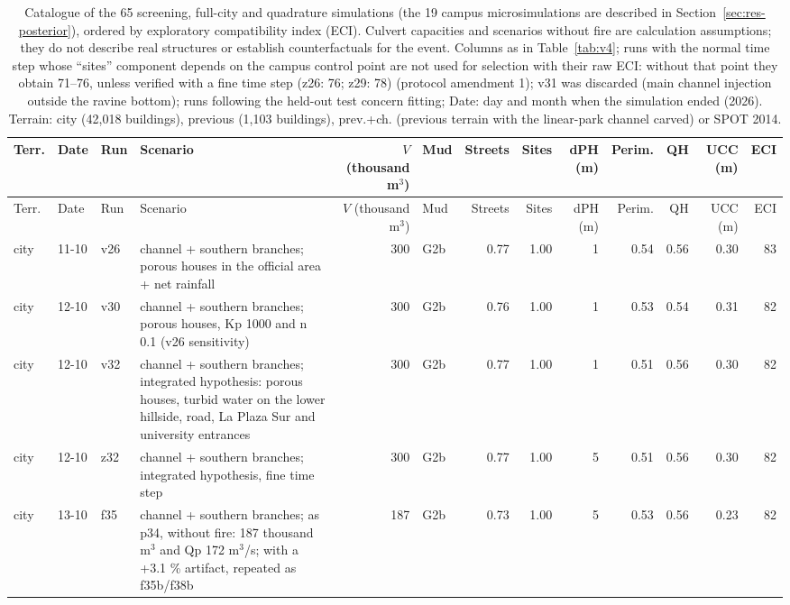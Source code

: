{\scriptsize\setlength{\tabcolsep}{2.5pt}
\begin{longtable}{lll>{\raggedright\arraybackslash}p{3.3cm}rlrrrrrrr}
\caption{Catalogue of the 65 screening, full-city and quadrature simulations (the 19 campus microsimulations are described in Section~\ref{sec:res-posterior}), ordered by exploratory compatibility index (ECI). Culvert capacities and scenarios without fire are calculation assumptions; they do not describe real structures or establish counterfactuals for the event. Columns as in Table~\ref{tab:v4}; runs with the normal time step whose ``sites'' component depends on the campus control point are not used for selection with their raw ECI: without that point they obtain 71--76, unless verified with a fine time step (z26: 76; z29: 78) (protocol amendment 1); v31 was discarded (main channel injection outside the ravine bottom); runs following the held-out test concern fitting; Date: day and month when the simulation ended (2026). Terrain: city (42,018 buildings), previous (1,103 buildings), prev.+ch. (previous terrain with the linear-park channel carved) or SPOT 2014.}\label{tab:catalogo}\\\toprule
Terr. & Date & Run & Scenario & $V$ (thousand m$^3$) & Mud & Streets & Sites & dPH (m) & Perim. & QH & UCC (m) & ECI\\\midrule\endfirsthead
\toprule Terr. & Date & Run & Scenario & $V$ (thousand m$^3$) & Mud & Streets & Sites & dPH (m) & Perim. & QH & UCC (m) & ECI\\\midrule\endhead
city & 11-10 & v26 & channel + southern branches; porous houses in the official area + net rainfall & 300 & G2b & 0.77 & 1.00 & 1 & 0.54 & 0.56 & 0.30 & 83\\
city & 12-10 & v30 & channel + southern branches; porous houses, Kp 1000 and n 0.1 (v26 sensitivity) & 300 & G2b & 0.76 & 1.00 & 1 & 0.53 & 0.54 & 0.31 & 82\\
city & 12-10 & v32 & channel + southern branches; integrated hypothesis: porous houses, turbid water on the lower hillside, road, La Plaza Sur and university entrances & 300 & G2b & 0.77 & 1.00 & 1 & 0.51 & 0.56 & 0.30 & 82\\
city & 12-10 & z32 & channel + southern branches; integrated hypothesis, fine time step & 300 & G2b & 0.77 & 1.00 & 5 & 0.51 & 0.56 & 0.30 & 82\\
city & 13-10 & f35 & channel + southern branches; as p34, without fire: 187 thousand m$^3$ and Qp 172 m$^3$/s; with a +3.1 \% artifact, repeated as f35b/f38b & 187 & G2b & 0.73 & 1.00 & 5 & 0.53 & 0.56 & 0.23 & 82\\

\end{longtable}}
